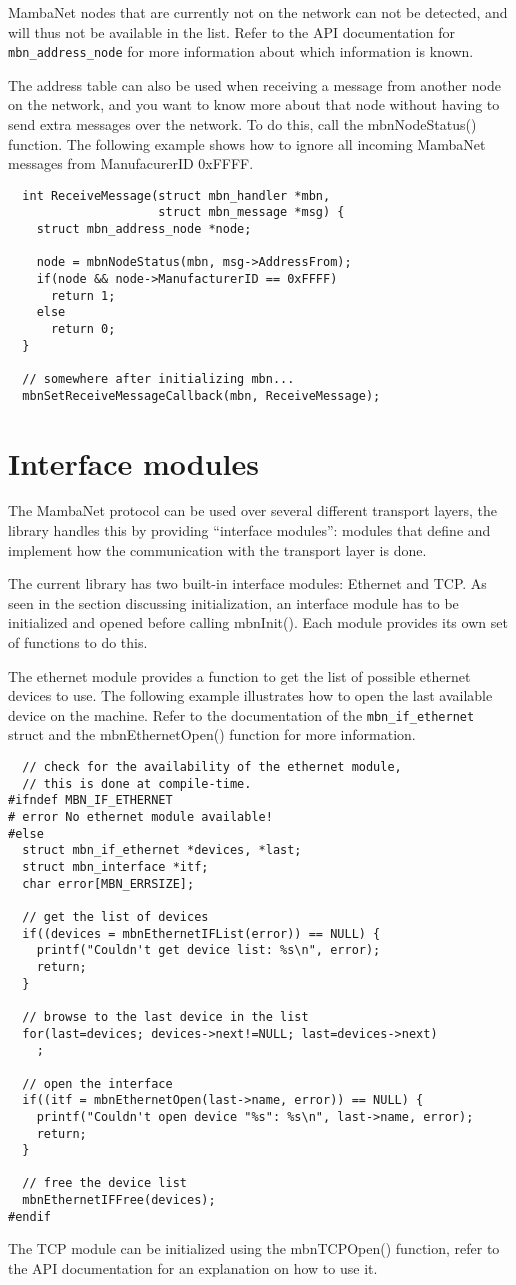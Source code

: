 MambaNet nodes that are currently not on the network can not be detected, and will thus not be available in the list. Refer to the API documentation for \verb|mbn_address_node| for more information about which information is known.

The address table can also be used when receiving a message from another node on the network, and you want to know more about that node without having to send extra messages over the network. To do this, call the mbnNodeStatus() function. The following example shows how to ignore all incoming MambaNet messages from ManufacurerID 0xFFFF.
\begin{verbatim}
  int ReceiveMessage(struct mbn_handler *mbn,
                     struct mbn_message *msg) {
    struct mbn_address_node *node;
    
    node = mbnNodeStatus(mbn, msg->AddressFrom);
    if(node && node->ManufacturerID == 0xFFFF)
      return 1;
    else
      return 0;
  }
  
  // somewhere after initializing mbn...
  mbnSetReceiveMessageCallback(mbn, ReceiveMessage);
\end{verbatim}



\section{Interface modules}
The MambaNet protocol can be used over several different transport layers, the library handles this by providing ``interface modules'': modules that define and implement how the communication with the transport layer is done.

The current library has two built-in interface modules: Ethernet and TCP. As seen in the section discussing initialization, an interface module has to be initialized and opened before calling mbnInit(). Each module provides its own set of functions to do this.

The ethernet module provides a function to get the list of possible ethernet devices to use. The following example illustrates how to open the last available device on the machine. Refer to the documentation of the \verb|mbn_if_ethernet| struct and the mbnEthernetOpen() function for more information.
\begin{verbatim}
  // check for the availability of the ethernet module,
  // this is done at compile-time.
#ifndef MBN_IF_ETHERNET
# error No ethernet module available!
#else
  struct mbn_if_ethernet *devices, *last;
  struct mbn_interface *itf;
  char error[MBN_ERRSIZE];
  
  // get the list of devices
  if((devices = mbnEthernetIFList(error)) == NULL) {
    printf("Couldn't get device list: %s\n", error);
    return;
  }
  
  // browse to the last device in the list
  for(last=devices; devices->next!=NULL; last=devices->next)
    ;
  
  // open the interface
  if((itf = mbnEthernetOpen(last->name, error)) == NULL) {
    printf("Couldn't open device "%s": %s\n", last->name, error);
    return;
  }
  
  // free the device list
  mbnEthernetIFFree(devices);
#endif
\end{verbatim}

The TCP module can be initialized using the mbnTCPOpen() function, refer to the API documentation for an explanation on how to use it.

